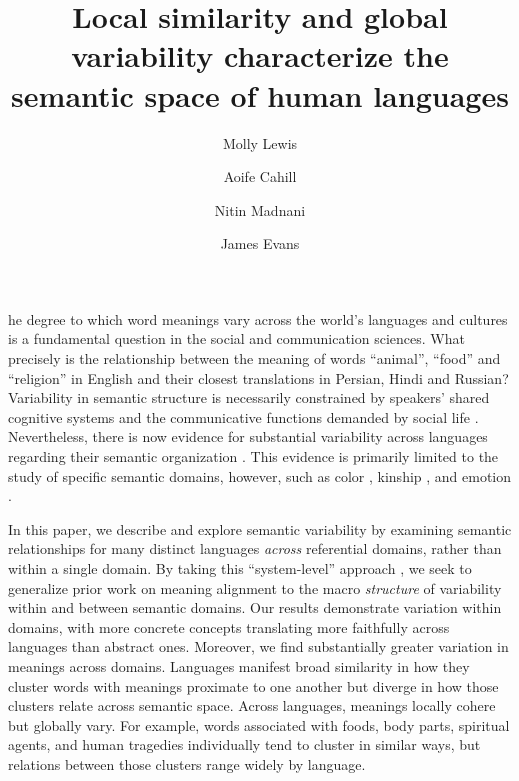 \documentclass[9pt,twocolumn,twoside,lineno]{pnas-new}
\title{Local similarity and global variability characterize the semantic space of human languages}
\author[a,1]{Molly Lewis}
\author[b]{Aoife Cahill}
\author[b]{Nitin Madnani}
\author[c,d,1]{James Evans}
\affil[a]{Carnegie Mellon University}
\affil[b]{Educational Testing Service}
\affil[c]{University of Chicago}
\affil[d]{Santa Fe Institute}
\begin{document}
\maketitle
\thispagestyle{firststyle}

he degree to which word meanings vary across the world's languages and cultures is a fundamental question in the social and communication sciences. What precisely is the relationship between the meaning of words ``animal'', ``food'' and ``religion'' in English and their closest translations in Persian, Hindi and Russian? Variability in semantic structure is necessarily constrained by speakers' shared cognitive systems and the communicative functions demanded by social life
\cite{kay2006language,zaslavsky2019color,Regier2009language,wnuk2022color,majid2007semantic,jackson2019emotion,xu2020conceptual, gentner2009some, kemp2012kinship, majid2015can, regier2007color, Malt2003-vv}. Nevertheless, there is now evidence for substantial variability across languages regarding their semantic organization \cite{Bowerman2003-vn, Levinson2006-bs, Malt2003-cb, Regier2008-ut, gennari2002motion, choi1999early, majid2018differential, majid2014odors, huisman2021patterns,regier2016languages, kemmerer2019concepts, malt1999knowing}. %
This evidence is primarily limited to the study of specific semantic domains, however, such as color \cite{berlin1991basic},  kinship \cite{murdock1970kin, kemp2012kinship}, and emotion \cite{jackson2019emotion}. 

In this paper, we describe and explore semantic variability by examining semantic relationships for many distinct languages \textit{across} referential domains, rather than within a single domain. By taking this ``system-level'' approach \cite{saussure, levi2008structural}, we seek to generalize prior work on meaning alignment to the macro {\it structure} of variability within and between semantic domains. Our results demonstrate variation within domains, with more concrete concepts translating more faithfully across languages than abstract ones. Moreover, we find substantially greater variation in meanings across domains. Languages manifest broad similarity in how they cluster words with meanings proximate to one another but diverge in how those clusters relate across semantic space. Across languages, meanings locally cohere but globally vary. For example, words associated with foods, body parts, spiritual agents, and human tragedies individually tend to cluster in similar ways, but relations between those clusters range widely by language.
\end{document}
